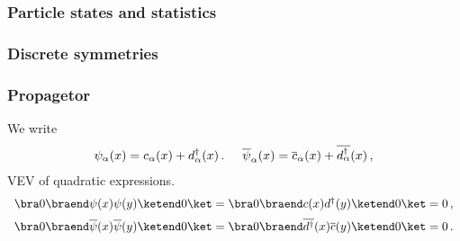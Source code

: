 \subsubsection{Particle states and statistics}

\subsubsection{Discrete symmetries}

\subsubsection{Propagetor}
We write 
\begin{eqnarray}
\psi_{\alpha}(x) = c_{\alpha}(x) + d_{\alpha}^\dagger(x)\,.
\hspace{5mm}
\overline{\psi}_{\alpha}(x) = \overline{c}_{\alpha}(x) + \overline{d_{\alpha}^\dagger}(x)\,,
\end{eqnarray}
VEV of quadratic expressions.
\begin{eqnarray}
\begin{array}{l}
\bra 0 \braend \psi(x) \psi(y) \ketend 0 \ket
=
\bra 0 \braend c(x) d^\dagger(y) \ketend 0 \ket
= 0 \,,
\vspace{2mm}
\\
\bra 0 \braend \overline{\psi}(x) \overline{\psi}(y) \ketend 0 \ket
=
\bra 0 \braend \overline{d^\dagger}(x) \overline{c}(y) \ketend 0 \ket
= 0 \,.
\end{array}
\end{eqnarray}

